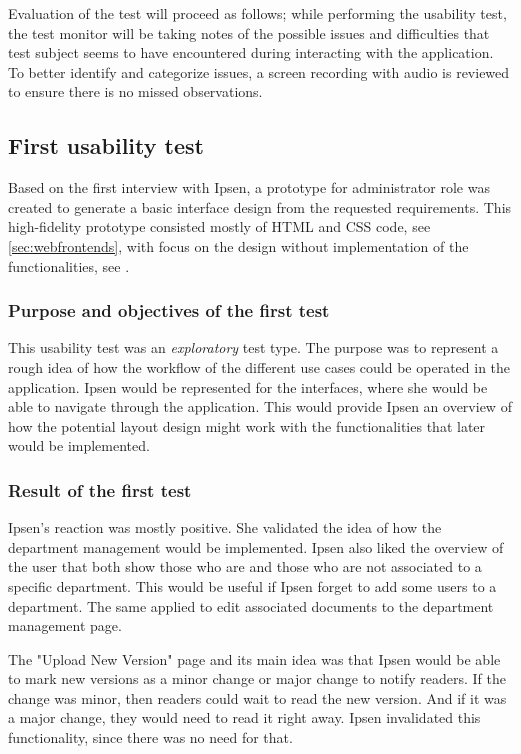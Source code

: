 \documentclass[../../master.tex]{subfiles}
\begin{document}
Evaluation of the test will proceed as follows; while performing the usability test, the test monitor will be taking notes of the possible issues and difficulties that test subject seems to have encountered during interacting with the application.
To better identify and categorize issues, a screen recording with audio is reviewed to ensure there is no missed observations.

\subsection{First usability test}\label{firsttest}
Based on the first interview with Ipsen, a prototype for administrator role was created to generate a basic interface design from the requested requirements.
This high-fidelity prototype consisted mostly of HTML and CSS code, see \cref{sec:webfrontends}, with focus on the design without implementation of the functionalities, see .

\subsubsection*{Purpose and objectives of the first test}
This usability test was an \textit{exploratory} test type.
The purpose was to represent a rough idea of how the workflow of the different use cases could be operated in the application.
Ipsen would be represented for the interfaces, where she would be able to navigate through the application.
This would provide Ipsen an overview of how the potential layout design might work with the functionalities that later would be implemented.

\subsubsection*{Result of the first test}
Ipsen's reaction was mostly positive.
She validated the idea of how the department management would be implemented.
Ipsen also liked the overview of the user that both show those who are and those who are not associated to a specific department.
This would be useful if Ipsen forget to add some users to a department.
The same applied to edit associated documents to the department management page.

The "Upload New Version" page and its main idea was that Ipsen would be able to mark new versions as a minor change or major change to notify readers.
If the change was minor, then readers could wait to read the new version.
And if it was a major change, they would need to read it right away.
Ipsen invalidated this functionality, since there was no need for that.
\end{document}

